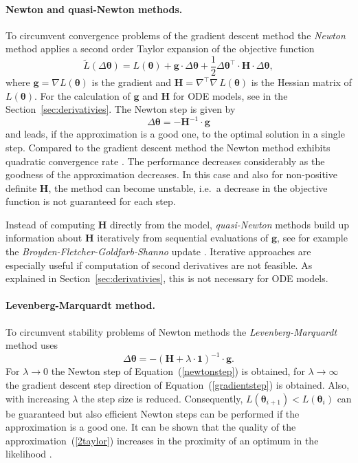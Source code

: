 \documentclass[12pt,a4paper]{scrartcl}
\begin{document}
\paragraph{Newton and quasi-Newton methods.}
To circumvent convergence problems of the gradient descent method the \emph{Newton} method applies a second order Taylor expansion of the objective function
\begin{equation}
	\tilde L(\Delta \boldsymbol{\theta}) = L(\boldsymbol{\theta}) + \mathbf{g} \cdot \Delta \boldsymbol{\theta} + \frac{1}{2} \Delta \boldsymbol{\theta}^\top \cdot \mathbf{H} \cdot \Delta \boldsymbol{\theta}, \label{2taylor}
\end{equation}
where $\mathbf{g} = \nabla L(\boldsymbol{\theta})$ is the gradient and $\mathbf{H} = \nabla^\top\nabla\, L(\boldsymbol{\theta})$ is the Hessian matrix of $L(\boldsymbol{\theta})$. For the calculation of $\mathbf{g}$ and $\mathbf{H}$ for ODE models, see in the Section~\ref{sec:derivativies}. The Newton step is given by 
\begin{equation}
	\Delta \boldsymbol{\theta} = -\mathbf{H}^{-1} \cdot \mathbf{g} \label{newtonstep}
\end{equation}
and leads, if the approximation is a good one, to the optimal solution in a single step. Compared to the gradient descent method the Newton method exhibits quadratic convergence rate \citep{Stoer:2005fk}. The performance decreases considerably as the goodness of the approximation decreases. In this case and also for non-positive definite $\mathbf{H}$, the method can become unstable, i.e.~a decrease in the objective function is not guaranteed for each step. 

Instead of computing $\mathbf{H}$ directly from the model, \emph{quasi-Newton} methods build up information about $\mathbf{H}$ iteratively from sequential evaluations of $\mathbf{g}$, see for example the \emph{Broyden-Fletcher-Goldfarb-Shanno} update \citep{Shanno:1970fk}. Iterative approaches are especially useful if computation of second derivatives are not feasible. As explained in Section~\ref{sec:derivativies}, this is not necessary for ODE models.

\paragraph{Levenberg-Marquardt method.}
To circumvent stability problems of Newton methods the \emph{Levenberg-Marquardt} method \citep{Marquardt:1963uq} uses 
\begin{equation}
	\Delta \boldsymbol{\theta} = -(\mathbf{H} + \lambda \cdot \mathbf{1})^{-1} \cdot 	\mathbf{g}. 
\end{equation}	
For $\lambda \rightarrow 0$ the Newton step of Equation~(\ref{newtonstep}) is obtained, for $\lambda \rightarrow \infty$ the gradient descent step direction of Equation~(\ref{gradientstep}) is obtained. Also, with increasing $\lambda$ the step size is reduced. Consequently, $L(\boldsymbol{\theta}_{i+1}) < L(\boldsymbol{\theta}_{i})$ can be guaranteed but also efficient Newton steps can be performed if the approximation is a good one. It can be shown that the quality of the approximation~(\ref{2taylor}) increases in the proximity of an optimum in the likelihood \citep{Seber:2003kq}.
\end{document}
